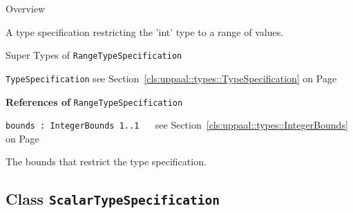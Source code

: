 	\begin{longdescription}
		\item[Overview] 		
				

	

		A type specification restricting the 'int' type to a range of values.		
		\item[Super Types of \texttt{RangeTypeSpecification}] ~
			\begin{longdescription}
				\item[\texttt{TypeSpecification}] see Section~\ref{cls:uppaal::types::TypeSpecification} on Page~\pageref{cls:uppaal::types::TypeSpecification}						\end{longdescription}
		
	
			\item[\textbf{References of} \texttt{RangeTypeSpecification}] ~
			\begin{longdescription}
	\item[\texttt{bounds : IntegerBounds 	\symbol{"5B}1..1\symbol{"5D}
}] ~
	see Section~\ref{cls:uppaal::types::IntegerBounds} on Page~\pageref{cls:uppaal::types::IntegerBounds}
	
	\nopagebreak
		
				

	

		The bounds that restrict the type specification.		
			\end{longdescription}
	
	\end{longdescription}
	

\subsection{Class \bfseries \texttt{ScalarTypeSpecification}\normalfont}
\label{cls:uppaal::types::ScalarTypeSpecification} 
	
